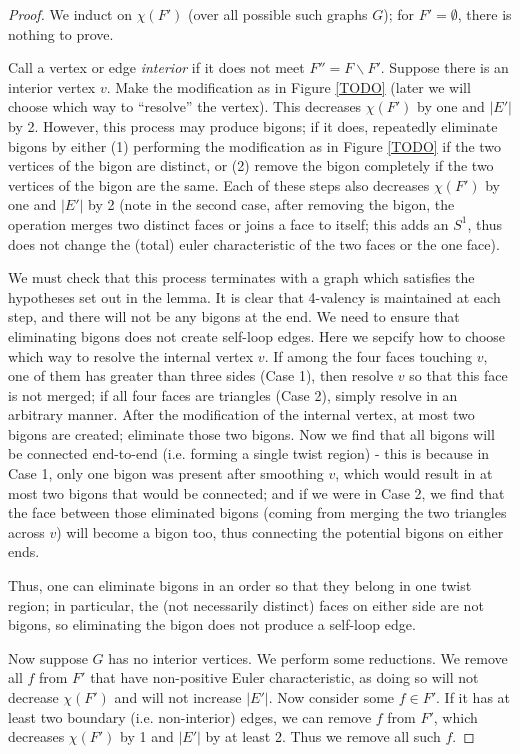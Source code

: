 \documentclass[11pt]{amsart}
\newcommand{\figref}[1]{Figure \ref{#1}}
\theoremstyle{plain}
\theoremstyle{definition}
\begin{document}
\begin{proof}
We induct on $\chi(F')$ (over all possible such graphs $G$);
for $F' = \emptyset$, there is nothing to prove.

Call a vertex or edge \emph{interior} if it does not meet
$F'' = F \backslash F'$.
Suppose there is an interior vertex $v$.
Make the modification as in \figref{TODO}
(later we will choose which way to ``resolve'' the vertex).
This decreases $\chi(F')$ by one and $|E'|$ by 2.
However, this process may produce bigons;
if it does, repeatedly eliminate bigons by either
(1) performing the modification as in \figref{TODO}
if the two vertices of the bigon are distinct,
or (2) remove the bigon completely if the two vertices
of the bigon are the same.
Each of these steps also decreases $\chi(F')$ by one and $|E'|$ by 2
(note in the second case, after removing the bigon,
the operation merges two distinct faces or joins a face to itself;
this adds an $S^1$, thus does not change the (total) euler characteristic
of the two faces or the one face).


We must check that this process terminates with a graph
which satisfies the hypotheses set out in the lemma.
It is clear that %
4-valency is maintained
at each step, and there will not be any bigons at the end.
We need to ensure that eliminating bigons does not
create self-loop edges.
Here we sepcify how to choose which way to resolve the internal
vertex $v$. If among the four faces touching $v$,
one of them has greater than three sides (Case 1),
then resolve $v$ so that this face is not merged;
if all four faces are triangles (Case 2),
simply resolve in an arbitrary manner.
After the modification of the internal vertex,
at most two bigons are created;
eliminate those two bigons.
Now we find that all bigons will be connected end-to-end
(i.e. forming a single twist region) -
this is because in Case 1, only one bigon was present after smoothing
$v$, which would result in at most two bigons that would be connected;
and if we were in Case 2, we find that the face between those
eliminated bigons (coming from merging the two triangles across $v$)
will become a bigon too,
thus connecting the potential bigons on either ends.

Thus, one can eliminate bigons in an order so that
they belong in one twist region;
in particular, the (not necessarily distinct) faces on either side
are not bigons,
so eliminating the bigon does not produce a self-loop edge.


Now suppose $G$ has no interior vertices.
We perform some reductions.
We remove all $f$ from $F'$ that have non-positive Euler characteristic,
as doing so will not decrease $\chi(F')$ and will not increase $|E'|$.
Now consider some $f\in F'$.
If it has at least two boundary (i.e. non-interior) edges,
we can remove $f$ from $F'$,
which decreases $\chi(F')$ by 1 and $|E'|$ by at least 2.
Thus we remove all such $f$.



\end{proof}
\end{document}
